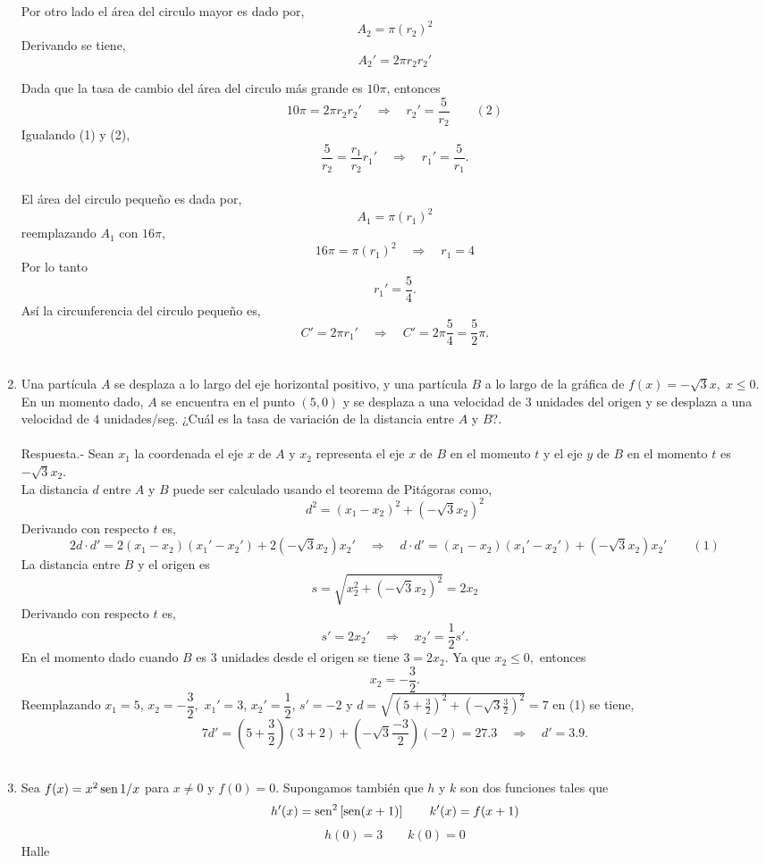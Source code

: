 \begin{enumerate}[\bfseries 1.]
	Por otro lado el área del circulo mayor es dado por,
	$$A_2=\pi(r_2)^2$$
	Derivando se tiene,
	$$A_2'=2\pi r_2 r_2'$$

	Dada que la tasa de cambio del área del circulo más grande es $10\pi$, entonces
	$$10\pi = 2\pi r_2 r_2' \quad \Rightarrow \quad r_2'=\dfrac{5}{r_2}\qquad (2)$$
	Igualando (1) y (2),
	$$\dfrac{5}{r_2}=\dfrac{r_1}{r_2}r_1'\quad \Rightarrow \quad r_1'=\dfrac{5}{r_1}.$$\\
	El área del circulo pequeño es dada por,
	$$A_1=\pi(r_1)^2$$
	reemplazando $A_1$ con $16\pi$,
	$$16\pi=\pi(r_1)^2 \quad \Rightarrow \quad r_1=4$$
	Por lo tanto 
	$$r_1'=\dfrac{5}{4}.$$
	Así la circunferencia del circulo pequeño es,
	$$C'=2\pi r_1' \quad \Rightarrow \quad C'=2\pi \dfrac{5}{4} = \dfrac{5}{2}\pi.$$\\

    \item Una partícula $A$ se desplaza a lo largo del eje horizontal positivo, y una partícula $B$ a lo largo de la gráfica de $f(x)=-\sqrt{3}x,\; x\leq 0$. En un momento dado, $A$ se encuentra en el punto $(5,0)$ y se desplaza a una velocidad de $3$ unidades del origen y se desplaza a una velocidad de $4$ unidades/seg. ¿Cuál es la tasa de variación de la distancia entre $A$ y $B$?.\\\\
	Respuesta.-\; Sean $x_1$ la coordenada el eje $x$ de $A$ y $x_2$ representa el eje $x$ de $B$ en el momento $t$ y el eje $y$ de $B$ en el momento $t$ es $-\sqrt{3}x_2.$\\
	La distancia $d$ entre $A$ y $B$ puede ser calculado usando el teorema de Pitágoras como,
	$$d^2=(x_1-x_2)^2+(-\sqrt{3}x_2)^2$$
	Derivando con respecto $t$ es,
	$$2d\cdot d' = 2(x_1-x_2)(x_1'-x_2')+2(-\sqrt{3}x_2)x_2' \quad \Rightarrow \quad d\cdot d'=(x_1-x_2)(x_1'-x_2')+(-\sqrt{3}x_2)x_2'\qquad (1)$$
	La distancia entre $B$ y el origen es 
	$$s=\sqrt{x_2^2+(-\sqrt{3}x_2)^2}=2x_2$$
	Derivando con respecto $t$ es,
	$$s'=2x_2'\quad \Rightarrow \quad x_2'=\dfrac{1}{2}s'.$$
	En el momento dado cuando $B$ es $3$ unidades desde el origen se tiene $3=2x_2$. Ya que $x_2\leq 0,$ entonces
	$$x_2=-\dfrac{3}{2}.$$
	Reemplazando $x_1=5$, $x_2=-\dfrac{3}{2},$ $x_1'=3$, $x_2'=\dfrac{1}{2}$, $s'=-2$ y $d=\sqrt{(5+\frac{3}{2})^2+(-\sqrt{3}\frac{3}{2})^2}=7$ en (1) se tiene,
	$$7d'=\left(5+\dfrac{3}{2}\right)(3+2)+\left(-\sqrt{3}\dfrac{-3}{2}\right)(-2)=27.3 \quad \Rightarrow \quad d'=3.9.$$\\


    \item Sea $f(x)=x^2\mathop{\mbox{\normalfont sen}}\nolimits 1/x$ para $x\neq 0$ y $f(0)=0$. Supongamos también que $h$ y $k$ son dos funciones tales que 
	$$h'(x)=\mathop{\mbox{\normalfont sen}}\nolimits^2\left[\mathop{\mbox{\normalfont sen}}\nolimits(x+1)\right]\qquad k'(x)=f(x+1)$$
	$$h(0)=3\qquad k(0)=0$$
	Halle


\end{enumerate}
